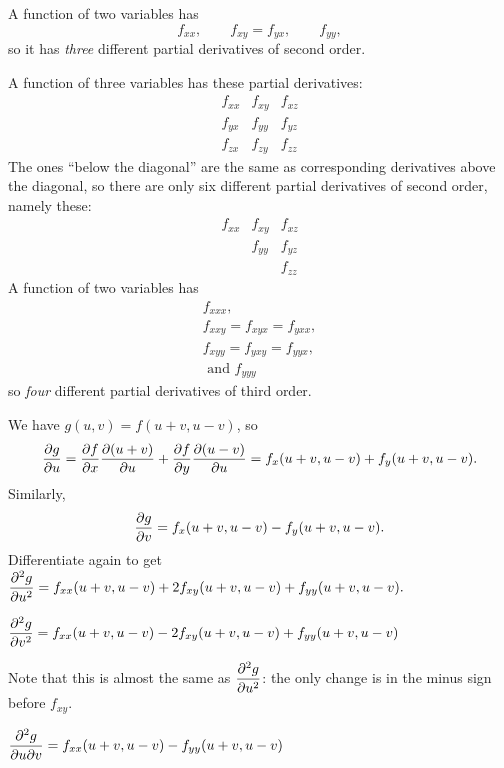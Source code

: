 A function of two variables has
\[
  f_{xx},\qquad f_{xy}=f_{yx},\qquad f_{yy},
\]
so it has \emph{three} different partial derivatives of second order.

A function of three variables has these partial derivatives:
\[
  \begin{matrix}
    f_{xx} & f_{xy} & f_{xz} \\
    f_{yx} & f_{yy} & f_{yz} \\
    f_{zx} & f_{zy} & f_{zz}
  \end{matrix}
\]
The ones ``below the diagonal'' are the same as corresponding derivatives
above the diagonal, so there are only six different partial derivatives
of second order, namely these:
\[
  \begin{matrix}
    f_{xx} & f_{xy} & f_{xz} \\
    & f_{yy} & f_{yz} \\
    & & f_{zz}
  \end{matrix}
\]
A function of two variables has
\begin{gather*}
  f_{xxx}, \\
  f_{xxy}=f_{xyx}=f_{yxx}, \\
  f_{xyy}=f_{yxy}=f_{yyx},\\
  \text{ and } f_{yyy}
\end{gather*}
so \emph{four} different partial derivatives of third order.
\bigskip

\item[{\bfseries(IV15.15a)}]

We have $g(u,v) = f(u+v, u-v)$, so
\[
  \frac{\partial g}{\partial u} = \frac{\partial f}{\partial x} \frac{\partial (u+v)}{\partial u} + \frac{\partial f}{\partial y} \frac{\partial (u-v)}{\partial u}
  = f_x(u+v, u-v)+f_y(u+v, u-v).
\]
Similarly,
\[
  \frac{\partial g}{\partial v} = f_x(u+v, u-v) - f_y(u+v, u-v).
\]
Differentiate again to get
\(\displaystyle
  \frac{\partial^2 g}{\partial u^2}
  = f_{xx}(u+v, u-v)+2f_{xy}(u+v, u-v)+f_{yy}(u+v, u-v).
\)
\bigskip

\item[{\bfseries(IV15.15b)}]

\(\displaystyle
\frac{\partial^2 g}{\partial v^2}
= f_{xx}(u+v, u-v)-2f_{xy}(u+v, u-v)+f_{yy}(u+v, u-v)
\)

Note that this is almost the same as $\dfrac{\partial^2g}{\partial u^2}$: the only change is in the minus sign before $f_{xy}$.
\bigskip

\item[{\bfseries(IV15.15c)}]

   $\displaystyle\frac{\partial^2 g}{\partial u\partial v}= f_{xx}(u+v, u-v) - f_{yy}(u+v, u-v)$
\bigskip

\item[{\bfseries(IV15.15d)}]


